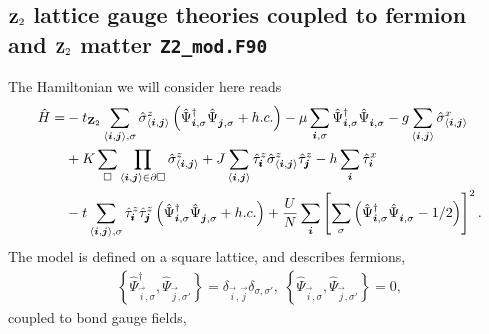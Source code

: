 

\subsection{$\mathbf{Z}_{2}$ lattice gauge theories coupled to fermion and $\mathbf{Z}_{2}$ matter  \texttt{Z2\_mod.F90}} \label{Z2.Sec}

The Hamiltonian we will consider here reads
\begin{align}
	\hat{H} =& -  t_{\Ztwo} \sum_{\langle \vec{i}, \vec{j} \rangle, \sigma } \hat{\sigma}^z_{\langle \vec{i}, \vec{j} \rangle}
	\left(\hat{\Psi}^{\dagger}_{\vec{i},\sigma} \hat{\Psi}^{\phantom{\dagger}}_{\vec{j},\sigma}   + h.c. \right) - \mu \sum_{\vec{i},\sigma} \hat{\Psi}^{\dagger}_{\vec{i},\sigma} \hat{\Psi}^{\phantom{\dagger}}_{\vec{i},\sigma}  
	-g \sum_{\langle \vec{i}, \vec{j} \rangle } \hat{\sigma}^{x}_{\langle \vec{i}, \vec{j} \rangle } \nonumber \\
	  & +K \sum_{\square} \prod_{\langle \vec{i}, \vec{j} \rangle \in \partial \square} \hat{\sigma}^{z}_{\langle \vec{i}, \vec{j} \rangle}  
	 + J  \sum_{\langle \vec{i}, \vec{j} \rangle}  \hat{\tau}^z_{\pmb{i}}  \hat{\sigma}^{z}_{\langle \vec{i}, \vec{j} \rangle} \hat{\tau}^z_{\pmb{j}}   
	      -  h \sum_{ \vec{i} } \hat{\tau}^x_{\vec{i}} \nonumber \\
	& - t  \sum_{\langle \vec{i}, \vec{j} \rangle, \sigma }   \hat{\tau}^z_{\pmb{i}}   \hat{\tau}^z_{\pmb{j}}  \left( \hat{\Psi}^{\dagger}_{\vec{i},\sigma} \hat{\Psi}^{\phantom{\dagger}}_{\vec{j},\sigma} 	+ h.c. \right) + \frac{U}{N}\sum_{\ve{i}} \left[ \sum_{\sigma}  \left( \hat{\Psi}^{\dagger}_{\ve{i},\sigma}  \hat{\Psi}^{\phantom\dagger}_{\ve{i},\sigma} - 1/2\right) \right]^2.
\end{align}  
The model is defined on a square lattice, and describes  fermions, 
\begin{align}
 \left\{ \hat{\Psi}^{\dagger}_{\vec{i},\sigma},  \hat{\Psi}^{\phantom\dagger}_{\vec{j},\sigma'} \right\}  = \delta_{\vec{i},\vec{j}} \delta_{\sigma,\sigma'}, \;  
\left\{ \hat{\Psi}^{\phantom\dagger}_{\vec{i},\sigma},  \hat{\Psi}^{\phantom\dagger}_{\vec{j},\sigma'} \right\}  =  0,  
\end{align}
coupled to  bond gauge fields, 
